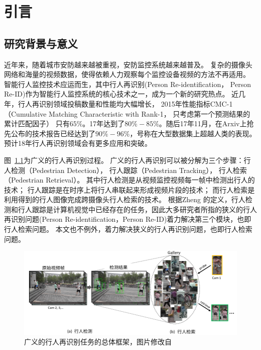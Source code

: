 ﻿%


\chapter{引言}

\section{研究背景与意义}

近年来，随着城市安防越来越被重视，安防监控系统越来越普及。
复杂的摄像头网络和海量的视频数据，使得依赖人力观察每个监控设备视频的方法不再适用。
智能行人监控技术应运而生，其中行人再识别(Person Re-identification， Person Re-ID)作为智能行人监控系统的核心技术之一，成为一个新的研究热点。
近几年，行人再识别领域投稿数量和性能均大幅增长，
2015年性能指标CMC-1（Cumulative Matching Characteristic with Rank-1， 只考虑第一个预测结果的累计匹配因子）
只有$65\%$。17年达到了$80\%-85\%$。随后17年11月，在Arxiv上抢先公布的技术报告已经达到了$90\%-96\%$，号称在大型数据集上超越人类的表现。预计18年行人再识别领域会有更多应用和突破。

图~\ref{fig:overall}为广义的行人再识别过程。
广义的行人再识别可以被分解为三个步骤：行人检测（Pedestrian Detection），
行人跟踪（Pedestrian Tracking），
行人检索（Pedestrian Retrieval）。
其中行人检测是从视频监控视频每一帧中检测出行人的技术；
行人跟踪是在时序上将行人串联起来形成视频片段的技术；
而行人检索是利用得到的行人图像完成跨摄像头行人检索的技术。
根据Zheng \etal \parencite{zheng2017person} 的定义，行人检测和行人跟踪是计算机视觉中已经存在的任务，因此大多研究者所指的狭义的行人再识别问题(Person Re-identification，Person Re-ID)着力解决第三个模块，也即
行人检索问题。
本文也不例外，着力解决狭义的行人再识别问题，也即行人检索问题。

\begin{figure}
	\includegraphics[width=\textwidth]{fig/background.png}
	\caption{广义的行人再识别任务的总体框架，图片修改自~\cite{zheng2017person}}
	\label{fig:overall}
\end{figure}

